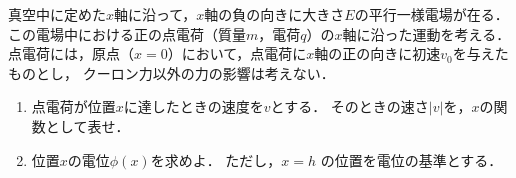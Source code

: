 \documentclass[../../../uem_phy_std_q.tex]{subfiles}
\begin{document}
    真空中に定めた$x$軸に沿って，$x$軸の負の向きに大きさ$E$の平行一様電場が在る．
    この電場中における正の点電荷（質量$m$，電荷$q$）の$x$軸に沿った運動を考える．
    点電荷には，原点（$x=0$）において，点電荷に$x$軸の正の向きに初速$v_0$を与えたものとし，
    クーロン力以外の力の影響は考えない．

    \begin{enumerate}
        \item 点電荷が位置$x$に達したときの速度を$v$とする．
            そのときの速さ$|v|$を，$x$の関数として表せ．
        \item 位置$x$の電位$\phi(x)$を求めよ．
            ただし，$x=h$ の位置を電位の基準とする．
    \end{enumerate}
\end{document}
